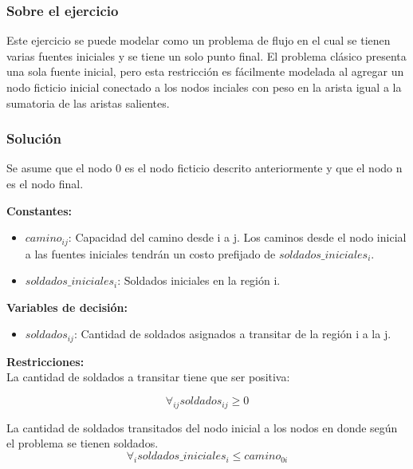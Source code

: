 \documentclass[a4paper,10pt,twocolumn]{article}
\theoremstyle{theorem}
\theoremstyle{definition}
\theoremstyle{remark}
\begin{document}
		\subsubsection{Sobre el ejercicio}\label{subsubsec:sobre_ejer_6}

Este ejercicio se puede modelar como un problema de flujo en el cual se tienen varias fuentes iniciales y se tiene un solo punto final. El problema clásico presenta una sola fuente inicial, pero esta restricción es fácilmente modelada al agregar un nodo ficticio inicial conectado a los nodos inciales con peso en la arista igual a la sumatoria de las aristas salientes.

		\subsubsection{Solución}\label{subsubsec:sol_ejer_6}

Se asume que el nodo 0 es el nodo ficticio descrito anteriormente y que el nodo n es el nodo final.

\textbf{Constantes:}

\begin{itemize}
	\item $camino_{ij}$: Capacidad del camino desde i a j. Los caminos desde el nodo inicial a las fuentes iniciales tendrán un costo prefijado de $soldados\_iniciales_i$. 
	\item $soldados\_iniciales_i$: Soldados iniciales en la región i.
\end{itemize}


\textbf{Variables de decisión:}

\begin{itemize}
	\item $soldados_{ij}$: Cantidad de soldados asignados a transitar de la región i a la j.
\end{itemize}

\textbf{Restricciones:}\\

La cantidad de soldados a transitar tiene que ser positiva:

$$
\forall_{ij} soldados_{ij} \ge 0
$$

La cantidad de soldados transitados del nodo inicial a los nodos en donde según el problema se tienen soldados.
$$
\forall_{i} soldados\_iniciales_i \le camino_{0i}
$$
\end{document}
